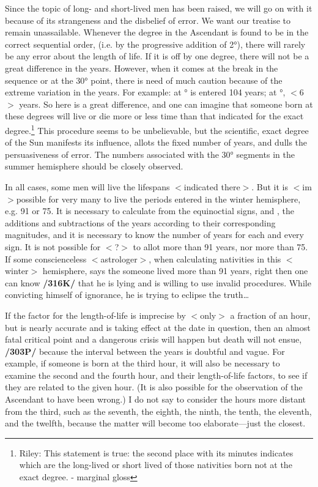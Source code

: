 Since the topic of long- and short-lived men has been raised, we will go on with it because of its strangeness and the disbelief of error. We want our treatise to remain unassailable. Whenever the degree in
the Ascendant is found to be in the correct sequential order, (i.e. by the progressive addition of 2°), there will rarely be any error about the length of life. If it is off by one degree, there will not be a great difference in the years. However, when it comes at the break in the sequence or at the 30° point, there is need of much caution because of the extreme variation in the years. For example: at \Cancer\xspace 27° is entered 104 years; at \Cancer\xspace 28°, $<$6$>$ years. So here is a great difference, and one can imagine that someone born at
these degrees will live or die more or less time than that indicated for the exact degree.\footnote{Riley: This statement is true: the second place with its minutes indicates which are the long-lived or short lived
of those nativities born not at the exact degree. - marginal gloss} This procedure seems to be unbelievable, but the scientific, exact degree of the Sun manifests its influence, allots the fixed number of years, and dulls the persuasiveness of error. The numbers associated with the 30° segments in the summer hemisphere should be closely observed.

In all cases, some men will live the lifespans $<$indicated there$>$. But it is $<$im$>$possible for very many to live the periods entered in the winter hemisphere, e.g. 91 or 75. It is necessary to calculate from the equinoctial signs, \Aries\xspace and \Libra, the additions and subtractions of the years according to their corresponding magnitudes, and it is necessary to know the number of years for each and every sign. It is not possible for \Libra\xspace $<$?$>$ to allot more than 91 years, nor \Capricorn\xspace more than 75. If some conscienceless $<$astrologer$>$, when calculating nativities in this $<$winter$>$ hemisphere, says the someone lived more than
91 years, right then one can know \textbf{/316K/} that he is lying and is willing to use invalid procedures. While convicting himself of ignorance, he is trying to eclipse the truth…

If the factor for the length-of-life is imprecise by $<$only$>$ a fraction of an hour, but is nearly accurate and is taking effect at the date in question, then an almost fatal critical point and a dangerous crisis will happen but death will not ensue, \textbf{/303P/} because the interval between the years is doubtful and vague. For example, if someone is born at the third hour, it will also be necessary to examine the second and the fourth hour, and their length-of-life factors, to see if they are related to the given hour. (It is also possible
for the observation of the Ascendant to have been wrong.) I do not say to consider the hours more distant from the third, such as the seventh, the eighth, the ninth, the tenth, the eleventh, and the twelfth, because the matter will become too elaborate—just the closest. 

